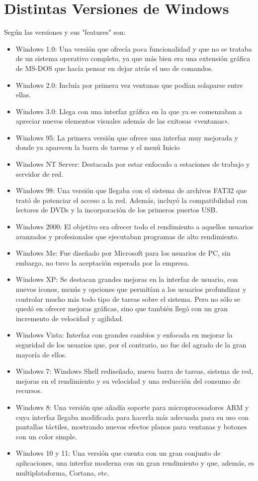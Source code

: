 \documentclass[stu, 12pt, letterpaper, donotrepeattitle, floatsintext, natbib, helv]{apa7}
\begin{document}
\section*{Distintas Versiones de Windows}
{}
Según \cite{versionesWindows} las versiones y sus "features" son:
\begin{itemize}
    \item Windows 1.0: Una versión que ofrecía poca funcionalidad y que no se trataba de un sistema operativo completo, ya que más bien era una extensión gráfica de MS-DOS que hacía pensar en dejar atrás el uso de comandos.
    \item Windows 2.0: Incluía por primera vez ventanas que podían solaparse entre ellas.
    \item Windows 3.0: Llega con una interfaz gráfica en la que ya se comenzaban a apreciar nuevos elementos visuales además de las exitosas «ventanas».
    \item Windows 95: La primera versión que ofrece una interfaz muy mejorada y donde ya aparecen la barra de tareas y el menú Inicio
    \item Windows NT Server: Destacada por estar enfocado a estaciones de trabajo y servidor de red.
    \item Windows 98: Una versión que llegaba con el sistema de archivos FAT32 que trató de potenciar el acceso a la red. Además, incluyó la compatibilidad con lectores de DVDs y la incorporación de los primeros puertos USB.
    \item Windows 2000: El objetivo era ofrecer todo el rendimiento a aquellos usuarios avanzados y profesionales que ejecutaban programas de alto rendimiento.
    \item Windows Me: Fue diseñado por Microsoft para los usuarios de PC, sin embargo, no tuvo la aceptación esperada por la empresa.
    \item Windows XP:  Se destacan grandes mejoras en la interfaz de usuario, con nuevos iconos, menús y opciones que permitían a los usuarios profundizar y controlar mucho más todo tipo de tareas sobre el sistema. Pero no sólo se quedó en ofrecer mejoras gráficas, sino que también llegó con un gran incremento de velocidad y agilidad.
    \item Windows Vista: Interfaz con grandes cambios y enfocada en mejorar la seguridad de los usuarios que, por el contrario, no fue del agrado de la gran mayoría de ellos.
    \item Windows 7: Windows Shell rediseñado, nueva barra de tareas, sistema de red, mejoras en el rendimiento y su velocidad y una reducción del consumo de recursos.
    \item Windows 8: Una versión que añadía soporte para microprocesadores ARM y cuya interfaz llegaba modificada para hacerla más adecuada para su uso con pantallas táctiles, mostrando nuevos efectos planos para ventanas y botones con un color simple.
    \item Windows 10 y 11: Una versión que cuenta con un gran conjunto de aplicaciones, una interfaz moderna con un gran rendimiento y que, además, es multiplataforma, Cortana, etc.

\end{itemize}
\end{document}
